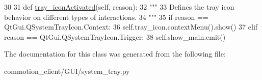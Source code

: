 \begin{DoxyCode}
30 
31     \textcolor{keyword}{def }\hyperlink{classcommotion__client_1_1GUI_1_1system__tray_1_1TrayIcon_a31999bfda4008b7395def282e37b4d5c}{tray\_iconActivated}(self, reason):
32         \textcolor{stringliteral}{"""}
33 \textcolor{stringliteral}{        Defines the tray icon behavior on different types of interactions.}
34 \textcolor{stringliteral}{        """}
35         \textcolor{keywordflow}{if} reason == QtGui.QSystemTrayIcon.Context:
36             self.tray\_icon.contextMenu().show()
37         \textcolor{keywordflow}{elif} reason == QtGui.QSystemTrayIcon.Trigger:
38             self.show\_main.emit()
\end{DoxyCode}


The documentation for this class was generated from the following file\+:\begin{DoxyCompactItemize}
\item 
commotion\+\_\+client/\+G\+U\+I/system\+\_\+tray.\+py\end{DoxyCompactItemize}
